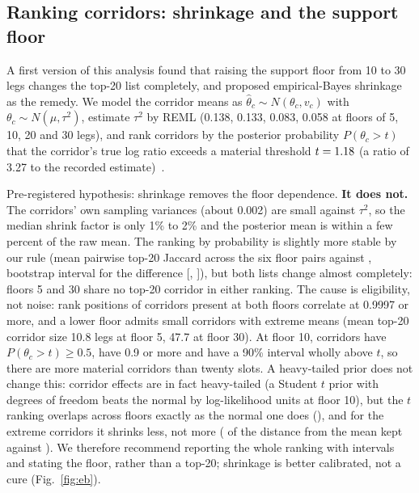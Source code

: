 \subsection{Ranking corridors: shrinkage and the support floor}\label{sec:support}
A first version of this analysis found that raising the support floor from 10 to 30 legs changes the top-20 list completely, and proposed empirical-Bayes shrinkage as the remedy. We model the corridor means as $\hat\theta_c\sim N(\theta_c,v_c)$ with $\theta_c\sim N(\mu,\tau^2)$, estimate $\tau^2$ by REML (0.138, 0.133, 0.083, 0.058 at floors of 5, 10, 20 and 30 legs), and rank corridors by the posterior probability $P(\theta_c>t)$ that the corridor's true log ratio exceeds a material threshold $t=1.18{}$ (a ratio of 3.27 to the recorded estimate)~\cite{efron1975data,morris1983parametric,laird1989empirical,gelman2007data}.

Pre-registered hypothesis: shrinkage removes the floor dependence. \textbf{It does not.} The corridors' own sampling variances (about 0.002) are small against $\tau^2$, so the median shrink factor is only 1\% to 2\% and the posterior mean is within a few percent of the raw mean. The ranking by probability is slightly more stable by our rule (mean pairwise top-20 Jaccard across the six floor pairs \fzEbTopTwentyJaccardEbDpTwo{} against \fzEbTopTwentyJaccardRawDpTwo{}, bootstrap interval for the difference [\fzEbDiffCiLowDpTwo{}, \fzEbDiffCiHighDpTwo{}]), but both lists change almost completely: floors 5 and 30 share no top-20 corridor in either ranking. The cause is eligibility, not noise: rank positions of corridors present at both floors correlate at 0.9997 or more, and a lower floor admits small corridors with extreme means (mean top-20 corridor size 10.8 legs at floor 5, 47.7 at floor 30). At floor 10, \fzEbPExceedHalf{} corridors have $P(\theta_c>t)\ge 0.5$, \fzEbPExceedNine{} have 0.9 or more and \fzEbIntervalAbove{} have a 90\% interval wholly above $t$, so there are more material corridors than twenty slots. A heavy-tailed prior does not change this: corridor effects are in fact heavy-tailed (a Student $t$ prior with \fzEbtBestNuFloorTenDpOne{} degrees of freedom beats the normal by \fzEbtLoglikGainFloorTenDpOne{} log-likelihood units at floor 10), but the $t$ ranking overlaps across floors exactly as the normal one does (\fzEbtTopTwentyJaccardDpTwo{}), and for the extreme corridors it shrinks less, not more (\fzEbtRetainedTDpTwo{} of the distance from the mean kept against \fzEbtRetainedNormalDpTwo{}). We therefore recommend reporting the whole ranking with intervals and stating the floor, rather than a top-20; shrinkage is better calibrated, not a cure\ifjournal{} (Fig.~\ref{fig:eb})\fi.

